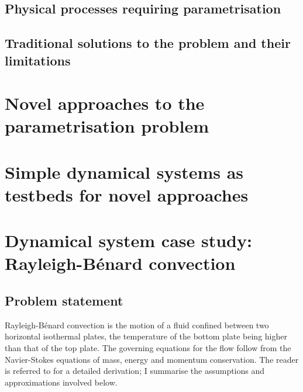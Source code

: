 \documentclass[titlepage]{article}
\numberwithin{equation}{section}
\newcommand{\rb}{Rayleigh-B\'{e}nard}
\begin{document}
\subsection{Physical processes requiring parametrisation}

\subsection{Traditional solutions to the problem and their limitations}


\newpage
\section{Novel approaches to the parametrisation problem}

\section{Simple dynamical systems as testbeds for novel approaches}

\newpage
\section{Dynamical system case study: \rb{} convection}
\subsection{Problem statement}
\rb{} convection is the motion of a fluid confined between two
horizontal isothermal plates, the temperature of the bottom plate being
higher than that of the top plate. The governing equations for the flow
follow from the Navier-Stokes equations of mass, energy and momentum
conservation. The reader is referred to \textcite{chandrasekhar1961} for
a detailed derivation; I summarise the assumptions and approximations
involved below.
\end{document}
